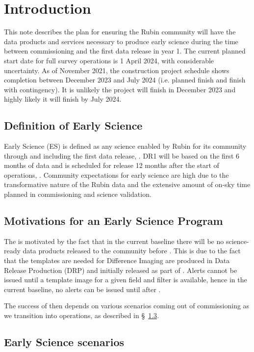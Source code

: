 \section{Introduction}

This  note describes the plan for ensuring the Rubin community will have the data products and services necessary to produce early science during the time between commissioning and the first data release in year 1. 
The current planned start date for full survey operations is 1 April 2024, with considerable uncertainty. 
As of November 2021, the construction project schedule shows completion between December 2023 and July 2024 (i.e. planned finish and finish with contingency). 
It is unlikely the project will finish in December 2023 and highly likely it will finish by July 2024. 

\subsection{Definition of Early Science}  \label{ssec:defn}

Early Science (ES) is defined as any science enabled by Rubin for its community through and including the first data release, \drone.
DR1 will be based on the first 6 months of data and is scheduled for release 12 months after the start of operations, \citep{RDO-011}.
Community expectations for early science are high due to the transformative nature of the Rubin data and the extensive amount of on-sky time planned in commissioning and science validation.

\subsection{Motivations for an Early Science Program}

The \esp is motivated by the fact that in the current baseline there will be no science-ready data products released to the community before \drone.
This is due to the fact that the templates are needed for Difference Imaging are produced in Data Release Production (DRP) and initially released as part of \drone. 
Alerts cannot be issued until a template image for a given field and filter is available, hence  in the current baseline, no alerts can be issued until after \drone.

The success of \es then depends on various scenarios coming out of commissioning as we transition into operations, as described in \S~\ref{ssec:scenarios}. 

\subsection{Early Science scenarios } \label{ssec:scenarios}

